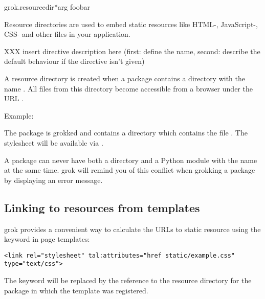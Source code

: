         \begin{funcdesc}{grok.resourcedir}{*arg}
        foobar
        \end{funcdesc}

        Resource directories are used to embed static resources like HTML-,
        JavaScript-, CSS- and other files in your application.

        XXX insert directive description here (first: define the name, second:
        describe the default behaviour if the directive isn't given)

        A resource directory is created when a package contains a directory
        with the name . All files from this directory become
        accessible from a browser under the URL
        .

        \begin{bf}Example:\end{bf} The package  is grokked and
        contains a directory  which contains the file
        . The stylesheet will be available via
        .

        \begin{notice}
        A package can never have both a  directory and a Python
        module with the name  at the same time. grok will
        remind you of this conflict when grokking a package by displaying an
        error message.
        \end{notice}

        \subsection{Linking to resources from templates}

            grok provides a convenient way to calculate the URLs to static
            resource using the keyword  in page templates:

            \begin{verbatim}
<link rel="stylesheet" tal:attributes="href static/example.css" type="text/css">
            \end{verbatim}

            The keyword  will be replaced by the reference to
            the resource directory for the package in which the template was
            registered.

